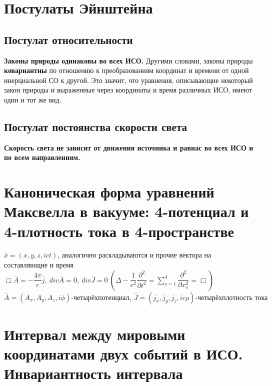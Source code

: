 \newcommand{\colontitulAutors}{edombek}
\newcommand{\colontitulYear}{2022}
\newcommand{\colontitulEducationalSubject}{СПЕЦИАЛЬНАЯ ТЕОРИЯ ОТНОСИТЕЛЬНОСТИ}
\newcommand{\colontitulTeacher}{И.~А.~Павличенко}




	\small
	\begin{multicols*}{2}
		\section{Постулаты Эйнштейна}
		
		\subsection{Постулат относительности}
		
		\textbf{Законы природы одинаковы во всех ИСО.} Другими словами, законы природы \textbf{ковариантны} по отношению к преобразованиям координат и времени от одной инерциальной СО к другой. Это значит, что уравнения, описывающие некоторый закон природы и выраженные через координаты и время различных ИСО, имеют один и тот же вид.
		
		\subsection{Постулат постоянства скорости света}
		
		\textbf{Скорость света не зависит от движения источника и равнас во всех ИСО и по всем направлениям.}
		
		\section{Каноническая форма уравнений Максвелла в вакууме: 4-потенциал и 4-плотность тока в 4-пространстве}
		
		$ \bar{x} = \left(x, y, z, ict\right) $, аналогично раскладываются и прочие вектора на составляющие и время \\
		$ \Box \bar{A} = -\dfrac{4\pi}{c}\bar{j},~ div{\bar{A}} = 0,~ div{\bar{J}} = 0~ \left(\Delta -\dfrac{1}{c^2}\dfrac{\partial^2}{\partial t^2}=\sum\limits_{s=1}^4\dfrac{\partial^2}{\partial x_s^2}=\Box\right) $  \\
		$ \bar{A} = \left(A_x, A_y, A_z, i\phi\right) \text{-четырёхпотенциал},~ \bar{J} = \left(j_x, j_y, j_z, ic\rho\right) \text{-четырёхплотность тока} $
		
		\section{Интервал между мировыми координатами двух событий в ИСО. Инвариантность интервала}
		

\end{multicols*}
